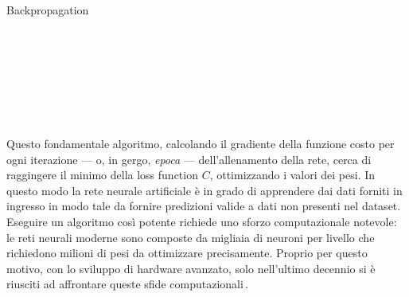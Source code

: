 \begin{algorithm}[ht]
    \caption{Backpropagation}\label{alg:backpropagation}
    \begin{algorithmic}
        \STATE\,
        \STATE\,

        \STATE\,
        \STATE\,


        \STATE\,
        \STATE\,


        \STATE\,
        \STATE\,

    \end{algorithmic}
\end{algorithm}

\noindent Questo fondamentale algoritmo, calcolando il gradiente della funzione costo per ogni iterazione — o, in gergo, \textsl{epoca} — dell'allenamento della rete, cerca di raggingere il minimo della loss function $C$, ottimizzando i valori dei pesi. In questo modo la rete neurale artificiale è in grado di apprendere dai dati forniti in ingresso in modo tale da fornire predizioni valide a dati non presenti nel dataset. Eseguire un algoritmo così potente richiede uno sforzo computazionale notevole: le reti neurali moderne sono composte da migliaia di neuroni per livello che richiedono milioni di pesi da ottimizzare precisamente. Proprio per questo motivo, con lo sviluppo di hardware avanzato, solo nell'ultimo decennio si è riusciti ad affrontare queste sfide computazionali\,\cite{flasinski2016introduction, rojas1996backpropagation, nielsen2015neural}.

